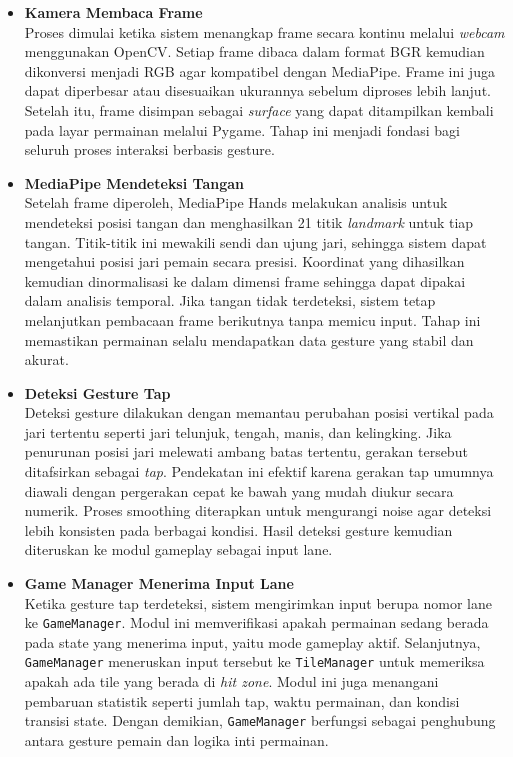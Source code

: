 \documentclass[12pt,a4paper]{article}
\begin{document}
\begin{itemize}

\item \textbf{Kamera Membaca Frame} \\
Proses dimulai ketika sistem menangkap frame secara kontinu melalui \textit{webcam} menggunakan OpenCV. Setiap frame dibaca dalam format BGR kemudian dikonversi menjadi RGB agar kompatibel dengan MediaPipe. Frame ini juga dapat diperbesar atau disesuaikan ukurannya sebelum diproses lebih lanjut. Setelah itu, frame disimpan sebagai \textit{surface} yang dapat ditampilkan kembali pada layar permainan melalui Pygame. Tahap ini menjadi fondasi bagi seluruh proses interaksi berbasis gesture.

\item \textbf{MediaPipe Mendeteksi Tangan} \\
Setelah frame diperoleh, MediaPipe Hands melakukan analisis untuk mendeteksi posisi tangan dan menghasilkan 21 titik \textit{landmark} untuk tiap tangan. Titik-titik ini mewakili sendi dan ujung jari, sehingga sistem dapat mengetahui posisi jari pemain secara presisi. Koordinat yang dihasilkan kemudian dinormalisasi ke dalam dimensi frame sehingga dapat dipakai dalam analisis temporal. Jika tangan tidak terdeteksi, sistem tetap melanjutkan pembacaan frame berikutnya tanpa memicu input. Tahap ini memastikan permainan selalu mendapatkan data gesture yang stabil dan akurat.

\item \textbf{Deteksi Gesture Tap} \\
Deteksi gesture dilakukan dengan memantau perubahan posisi vertikal pada jari tertentu seperti jari telunjuk, tengah, manis, dan kelingking. Jika penurunan posisi jari melewati ambang batas tertentu, gerakan tersebut ditafsirkan sebagai \textit{tap}. Pendekatan ini efektif karena gerakan tap umumnya diawali dengan pergerakan cepat ke bawah yang mudah diukur secara numerik. Proses smoothing diterapkan untuk mengurangi noise agar deteksi lebih konsisten pada berbagai kondisi. Hasil deteksi gesture kemudian diteruskan ke modul gameplay sebagai input lane.

\item \textbf{Game Manager Menerima Input Lane} \\
Ketika gesture tap terdeteksi, sistem mengirimkan input berupa nomor lane ke \texttt{GameManager}. Modul ini memverifikasi apakah permainan sedang berada pada state yang menerima input, yaitu mode gameplay aktif. Selanjutnya, \texttt{GameManager} meneruskan input tersebut ke \texttt{TileManager} untuk memeriksa apakah ada tile yang berada di \textit{hit zone}. Modul ini juga menangani pembaruan statistik seperti jumlah tap, waktu permainan, dan kondisi transisi state. Dengan demikian, \texttt{GameManager} berfungsi sebagai penghubung antara gesture pemain dan logika inti permainan.


\end{itemize}
\end{document}
